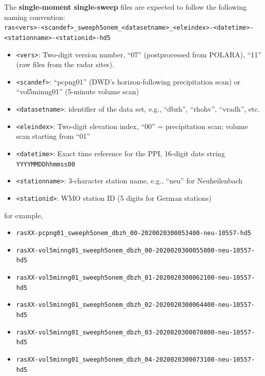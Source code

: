 \documentclass[10pt,a4paper,twoside,headinclude,footinclude,parskip=half]{scrartcl}
\begin{document}
\begin{itemize}
    The \textbf{single-moment single-sweep} files are expected to follow the following naming convention:\\[0.5em]
    \hspace*{-2cm}\verb|ras<vers>-<scandef>_sweeph5onem_<datasetname>_<eleindex>-<datetime>-<stationname>-<stationid>-hd5|
    \begin{itemize}
    \item \verb|<vers>|: Two-digit version number, ``07'' (postprocessed from POLARA), ``11'' (raw files from the radar sites).
    \item \verb|<scandef>|: ``pcpng01'' (DWD's horizon-following precipitation scan) or ``vol5minng01'' (5-minute volume scan)
    \item \verb|<datasetname>|: identifier of the data set, e.g., ``dbzh'', ``rhohv'', ``vradh'', etc.
    \item \verb|<eleindex>|: Two-digit elevation index, ``00'' = precipitation scan; volume scan starting from ``01''
    \item \verb|<datetime>|: Exact time reference for the PPI, 16-digit date string \verb|YYYYMMDDhhmmss00|
    \item \verb|<stationname>|: 3-character station name, e.g., ``neu'' for Neuheilenbach
    \item \verb|<stationid>|: WMO station ID (5 digits for German stations)
    \end{itemize}
    for example,
    \begin{itemize}
    \item \verb|rasXX-pcpng01_sweeph5onem_dbzh_00-2020020300053400-neu-10557-hd5|
    \item \verb|rasXX-vol5minng01_sweeph5onem_dbzh_00-2020020300055800-neu-10557-hd5|
    \item \verb|rasXX-vol5minng01_sweeph5onem_dbzh_01-2020020300062100-neu-10557-hd5|
    \item \verb|rasXX-vol5minng01_sweeph5onem_dbzh_02-2020020300064400-neu-10557-hd5|
    \item \verb|rasXX-vol5minng01_sweeph5onem_dbzh_03-2020020300070800-neu-10557-hd5|
    \item \verb|rasXX-vol5minng01_sweeph5onem_dbzh_04-2020020300073100-neu-10557-hd5|
    \end{itemize}

    \vspace*{1em}
    

\end{itemize}
\end{document}
